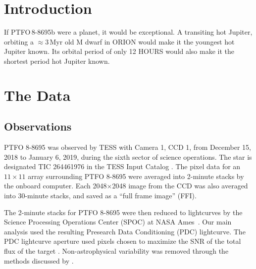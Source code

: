 \documentclass[12pt,twocolumn,tighten]{aastex62}
\begin{document}
\keywords{}


\section{Introduction}
If PTFO$\,$8-8695b were a planet, it would be exceptional.
A transiting hot Jupiter, orbiting a $\approx$3$\,$Myr old M dwarf
in ORION would make it the youngest hot Jupiter known.
Its orbital period of only 12 HOURS would also make it the shortest
period hot Jupiter known.


\section{The Data}
\label{sec:observations}

\subsection{Observations}

PTFO 8-8695 was observed by TESS with Camera 1, CCD 1, from December
15, 2018 to January 6, 2019, during the sixth sector of science
operations.  The star is designated TIC 264461976 in the TESS Input
Catalog \citep{stassun_TIC_2018,stassun_TIC8_2019}.  The pixel data
for an $11\times11$ array surrounding PTFO 8-8695 were averaged into
2-minute stacks by the onboard computer.  Each 2048$\times$2048 image
from the CCD was also averaged into 30-minute stacks, and saved as a
``full frame image'' (FFI).

The 2-minute stacks for PTFO 8-8695 were then reduced to lightcurves
by the Science Processing Operations Center (SPOC) at NASA
Ames~\citep{jenkins_tess_2016}.  Our main analysis used the resulting
Presearch Data Conditioning (PDC) lightcurve.  The PDC lightcurve
aperture used pixels chosen to maximize the SNR of the total flux of
the target \citep{smith_kepler_apertures_2017}.  Non-astrophysical
variability was removed through the methods discussed by
\citet{smith_kepler_PDC_2017}.
\end{document}
